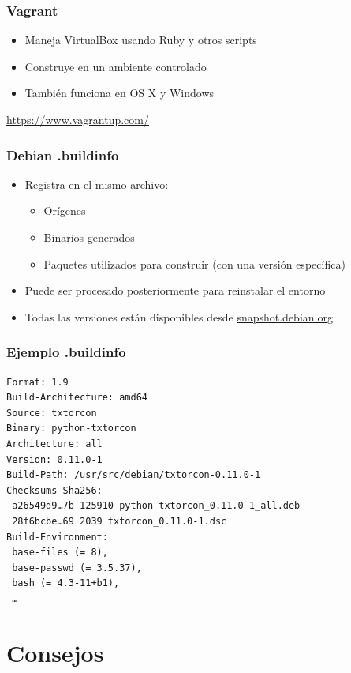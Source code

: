 \documentclass[14pt,aspectratio=169]{beamer}
\begin{document}
\begin{frame}
 \frametitle{Vagrant}

 \begin{itemize}
  \item Maneja VirtualBox usando Ruby y otros scripts
  \item Construye en un ambiente controlado
  \item También funciona en OS X y Windows
 \end{itemize}

 \vfill
 {\footnotesize
 \url{https://www.vagrantup.com/}
 }
\end{frame}

\begin{frame}
 \frametitle{Debian .buildinfo}

 \begin{itemize}
  \item Registra en el mismo archivo:
   \begin{itemize}
    \item Orígenes
    \item Binarios generados
    \item Paquetes utilizados para construir (con una versión específica)
   \end{itemize}
  \item Puede ser procesado posteriormente para reinstalar el entorno
  \item Todas las versiones están disponibles desde \url{snapshot.debian.org}
 \end{itemize}
\end{frame}

\begin{frame}[fragile]
 \frametitle{Ejemplo .buildinfo}

{\small
\begin{verbatim}
Format: 1.9
Build-Architecture: amd64
Source: txtorcon
Binary: python-txtorcon
Architecture: all
Version: 0.11.0-1
Build-Path: /usr/src/debian/txtorcon-0.11.0-1
Checksums-Sha256:
 a26549d9…7b 125910 python-txtorcon_0.11.0-1_all.deb
 28f6bcbe…69 2039 txtorcon_0.11.0-1.dsc
Build-Environment:
 base-files (= 8),
 base-passwd (= 3.5.37),
 bash (= 4.3-11+b1),
 …
\end{verbatim}
}
\end{frame}

\section{Consejos}
\end{document}
